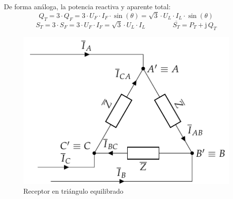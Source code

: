 	De forma análoga, la potencia reactiva y aparente total:
	\begin{equation}
	    \boxed{Q_T=3\cdot Q_F=3\cdot U_F\cdot {I_F}\cdot\sin(\theta)=\sqrt{3}\cdot U_L\cdot I_L\cdot\sin(\theta)}
	\end{equation}
	\begin{equation}
	    \boxed{S_T=3\cdot S_F=3\cdot U_F\cdot {I_F}=\sqrt{3}\cdot U_L\cdot I_L}  \qquad\qquad \boxed{\overline{S_T}=P_T+\mathrm{j}\,Q_T}
	\end{equation}
	
	\begin{figure}
	    \centering
	    \includegraphics{../figs/TrianguloEquilibrado_Receptor.pdf}
	    \caption{Receptor en triángulo equilibrado}
	    \label{fig:trianguloEquilibrado_receptor_potencia}
	\end{figure}
	
